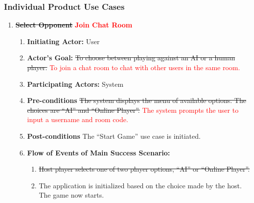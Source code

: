 \documentclass[12pt, titlepage]{article}
\begin{document}
\FloatBarrier
        \subsubsection{Individual Product Use Cases}
            \begin{enumerate}[{UC}1.]
                \item \sout{\textbf{Select Opponent}} \textbf{\textcolor{red}{Join Chat Room}}
                    \begin{enumerate}[{ }]
                        \item \textbf{Initiating Actor:} 
                            User
            
                        \item \textbf{Actor's Goal:} 
                            \sout{To choose between playing against an AI or a human player.} \textcolor{red}{To join a chat room to chat with other users in the same room.}
                        
                        \item \textbf{Participating Actors:} 
                            System
                        
                        \item \textbf{Pre-conditions}
                            \sout{The system displays the menu of available options. The choices are ``AI'' and ``Online Player''.} \textcolor{red}{The system prompts the user to input a username and room code.}
                        
                        \item \textbf{Post-conditions}
                            The ``Start Game'' use case is initiated.
                            
                        \item \textbf{Flow of Events of Main Success Scenario:}
                           \begin{enumerate}
                                \item \sout{Host player selects one of two player options, ``AI'' or ``Online Player''.} 
                                \item The application is initialized based on the choice made by the host. The game now starts.
                            \end{enumerate}
                    \end{enumerate}
            

\end{enumerate}
\end{document}
